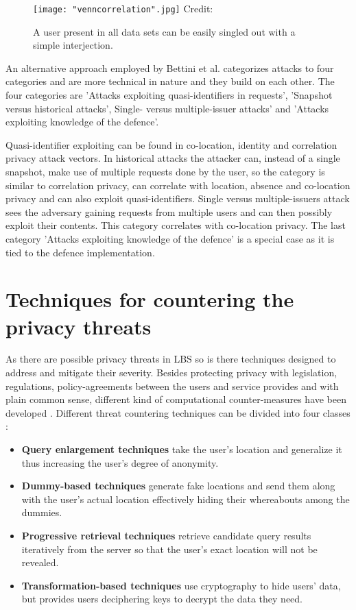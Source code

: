 \documentclass[english]{tktltiki2}
\theoremstyle{definition}
\theoremstyle{remark}
\begin{document}
\begin{figure}[ht!]
\centering
{}
\texttt{[image: "venncorrelation".jpg]}
\hbox{\scriptsize Credit:}
\caption{A user present in all data sets can be easily singled out with a simple interjection.}
\label{fig:venn}
\end{figure} 

An alternative approach employed by Bettini et al. categorizes attacks to four categories and are more technical in nature\cite{Bettini2009} and they build on each other. The four categories are 'Attacks exploiting quasi-identifiers in requests', 'Snapshot versus historical attacks', Single- versus multiple-issuer attacks' and 'Attacks exploiting knowledge of the defence'. \par
 Quasi-identifier exploiting can be found in co-location, identity and correlation privacy attack vectors. In historical attacks the attacker can, instead of a single snapshot, make use of multiple requests done by the user, so the category is similar to correlation privacy, can correlate with location, absence and co-location privacy and can also exploit quasi-identifiers. Single versus multiple-issuers attack sees the adversary gaining requests from multiple users and can then possibly exploit their contents. This category correlates with co-location privacy. The last category 'Attacks exploiting knowledge of the defence' is a special case as it is tied to the defence implementation.  


\section{Techniques for countering the privacy threats}


As there are possible privacy threats in LBS so is there techniques designed to address and mitigate their severity. Besides protecting privacy with legislation, regulations, policy-agreements between the users and service provides and with plain common sense, different kind of computational counter-measures have been developed \cite{Krumm2008}. Different threat countering techniques can be divided into four classes \cite{Krumm2008, Jensen2009}:
\begin{itemize}
\item \textbf{Query enlargement techniques} take the user's location and generalize it thus increasing the user's degree of anonymity. 
\item \textbf{Dummy-based techniques} generate fake locations and send them along with the user's actual location effectively hiding their whereabouts among the dummies.
\item \textbf{Progressive retrieval techniques} retrieve candidate query results iteratively from the server so that the user's exact location will not be revealed.
\item \textbf{Transformation-based techniques} use cryptography to hide users' data, but provides users deciphering keys to decrypt the data they need. 
\end{itemize}
\end{document}
